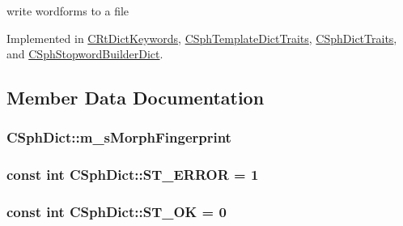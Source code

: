 write wordforms to a file 



Implemented in \hyperlink{classCRtDictKeywords_ace440f33f756909d9161c4eb1a005b0e}{C\-Rt\-Dict\-Keywords}, \hyperlink{structCSphTemplateDictTraits_a311a4fd5033e1226e8b6258351d5f933}{C\-Sph\-Template\-Dict\-Traits}, \hyperlink{classCSphDictTraits_a0659ebe6ea5a3c0a56e21018f0e7f775}{C\-Sph\-Dict\-Traits}, and \hyperlink{classCSphStopwordBuilderDict_aaa02664e1d2e0a048cc58184514e5791}{C\-Sph\-Stopword\-Builder\-Dict}.



\subsection{Member Data Documentation}
\hypertarget{classCSphDict_a35380dc83e22ed66a29f47f351f8da82}{
\subsubsection[{m\-\_\-s\-Morph\-Fingerprint}]{ C\-Sph\-Dict\-::m\-\_\-s\-Morph\-Fingerprint\hspace{0.3cm}{\ttfamily [protected]}}}\label{classCSphDict_a35380dc83e22ed66a29f47f351f8da82}
\hypertarget{classCSphDict_abdab06fefa18a50d30e06d19f995c7c5}{
\subsubsection[{S\-T\-\_\-\-E\-R\-R\-O\-R}]{\setlength{\rightskip}{0pt plus 5cm}const {\bf int} C\-Sph\-Dict\-::\-S\-T\-\_\-\-E\-R\-R\-O\-R = 1\hspace{0.3cm}{\ttfamily [static]}}}\label{classCSphDict_abdab06fefa18a50d30e06d19f995c7c5}
\hypertarget{classCSphDict_ab5cf35eecf21bb5b01c449c8d6a6e334}{
\subsubsection[{S\-T\-\_\-\-O\-K}]{\setlength{\rightskip}{0pt plus 5cm}const {\bf int} C\-Sph\-Dict\-::\-S\-T\-\_\-\-O\-K = 0\hspace{0.3cm}{\ttfamily [static]}}}\label{classCSphDict_ab5cf35eecf21bb5b01c449c8d6a6e334}
